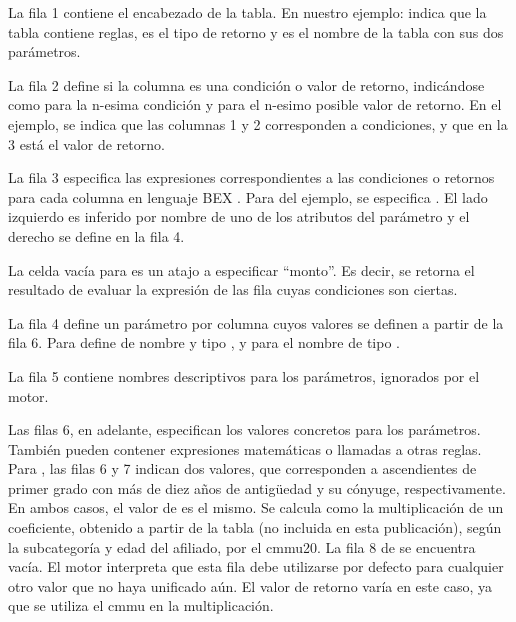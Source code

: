 La fila 1 contiene el encabezado de la tabla.
En nuestro ejemplo:  indica que la tabla contiene reglas,
 es el tipo de retorno y  es el nombre de la tabla con sus dos parámetros.

La fila 2 define si la columna es una condición o valor de retorno, indicándose como   para la n-esima condición y  para el n-esimo posible valor de retorno.
En el ejemplo, se indica que las columnas 1 y 2 corresponden a condiciones, y que en la 3 está el valor de retorno.

La fila 3 especifica las expresiones correspondientes a las condiciones o retornos para cada columna en lenguaje BEX \cite{openl}.
Para  del ejemplo, se especifica .
El lado izquierdo es inferido por nombre de uno de los atributos del parámetro  y el derecho se define en la fila 4.

La celda vacía para  es un atajo a especificar ``monto''.
Es decir, se retorna el resultado de evaluar la expresión de las fila cuyas condiciones son ciertas.

La fila 4 define un parámetro por columna cuyos valores se definen a partir de la fila 6.
Para  define de nombre  y tipo , y para  el nombre  de tipo .

La fila 5 contiene nombres descriptivos para los parámetros, ignorados por el motor.

Las filas 6, en adelante, especifican los valores concretos para los parámetros.
También pueden contener expresiones matemáticas o llamadas a otras reglas.
%
Para , las filas 6 y 7 indican dos valores, que corresponden a ascendientes de primer grado con más de diez años de antigüedad y su cónyuge, respectivamente.
En ambos casos, el valor de  es el mismo.
Se calcula como la multiplicación de un coeficiente, obtenido a partir de la tabla  (no incluida en esta publicación), según la subcategoría y edad del afiliado, por el \acrshort{cmmu20}.
%
La fila 8 de  se encuentra vacía.
El motor interpreta que esta fila debe utilizarse por defecto para cualquier otro valor que no haya unificado aún.
El valor de retorno varía en este caso, ya que se utiliza el \acrshort{cmmu} en la multiplicación.

